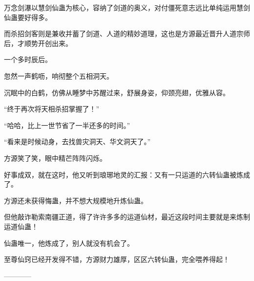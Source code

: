 \begin{this_body}
万念剑瀑以慧剑仙蛊为核心，容纳了剑道的奥义，对付僵死意志远比单纯运用慧剑仙蛊要好得多。

而杀招剑客则是兼收并蓄了剑道、人道的精妙道理，这也是方源最近晋升人道宗师后，才顺势开创出来。

一个多时辰后。

忽然一声鹤呖，响彻整个五相洞天。

沉眠中的白鹤，仿佛从睡梦中苏醒过来，舒展身姿，仰颈亮翅，优雅从容。

“终于再次将天相杀招掌握了！”

“哈哈，比上一世节省了一半还多的时间。”

“看来是时候动身，去找兽灾洞天、华文洞天了。”

方源笑了笑，眼中精芒阵阵闪烁。

好事成双，就在这时，他又听到琅琊地灵的汇报：又有一只运道的六转仙蛊被炼成了。

方源还未获得悔蛊，并不想大规模地升炼仙蛊。

但他敲诈勒索南疆正道，得了许许多多的运道仙材，最近这段时间主要就是来炼制运道仙蛊！

仙蛊唯一，他炼成了，别人就没有机会了。

至尊仙窍已经开发得不错，方源财力雄厚，区区六转仙蛊，完全喂养得起！

------------

\end{this_body}

